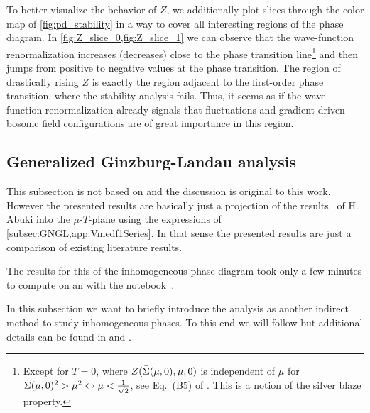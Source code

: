 To better visualize the behavior of $Z$, we additionally plot slices through the color map of \cref{fig:pd_stability} in a way to cover all interesting regions of the phase diagram.
In \cref{fig:Z_slice_0,fig:Z_slice_1} we can observe that the wave-function renormalization increases (decreases) close to the phase transition line\footnote{Except for ${T=0}$, where $Z ( \bar{\Sigma}(\mu,0), \mu, 0 )$ is independent of $\mu$ for $\bar{\Sigma}(\mu,0)^2>\mu^2 \Leftrightarrow \mu < \tfrac{1}{\sqrt{2}}$, see Eq.~(B5) of . This is a notion of the silver blaze property.} and then jumps from positive to negative values at the phase transition.
The region of drastically rising $Z$ is exactly the region adjacent to the first-order phase transition, where the stability analysis fails.
Thus, it seems as if the wave-function renormalization already signals that fluctuations and gradient driven bosonic field configurations are of great importance in this region.

\subsection{Generalized Ginzburg-Landau analysis}\label{subsec:GNggl}
\begin{disclaimer}
	This subsection is not based on  and the discussion is original to this work.
	However the presented results are basically just a projection of the results~\cite{Abuki:2011pf} of H. Abuki \etal{} into the $\mu$-$T$-plane using the expressions of \cref{subsec:GNGL,app:Vmedf1Series}.
	In that sense the presented results are just a comparison of existing literature results.
	
	The results for this \ggla{} of the inhomogeneous phase diagram took only a few minutes to compute on an \intel{} with the \WAM{} notebook~\cite{Steil:2023GNnotebook}.
\end{disclaimer}
In this subsection we want to briefly introduce the  analysis as another indirect method to study inhomogeneous phases.
To this end we will follow  but additional details can be found in \ccite{\gglRefs} and .\bigskip

